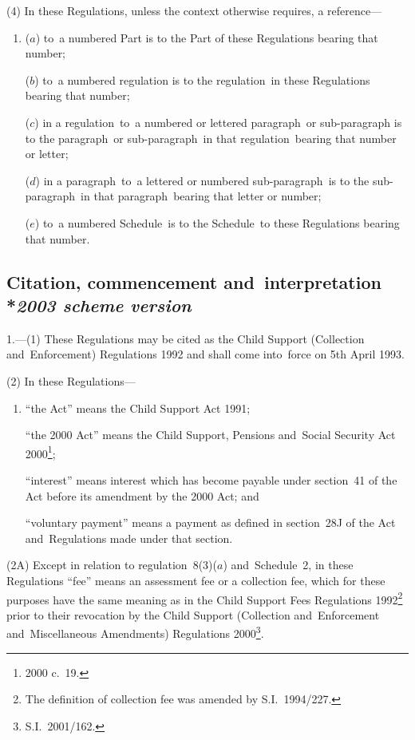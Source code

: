 \documentclass[12pt,a4paper]{article}
\begin{document}
(4) In these Regulations, unless the context otherwise requires, a reference—
\begin{enumerate}\item[]
($a$) to~a numbered Part is to the Part of these Regulations bearing that number;

($b$) to~a numbered regulation is to the regulation~in these Regulations bearing that number;

($c$) in a regulation~to~a numbered or lettered paragraph~or sub-paragraph is to the paragraph~or sub-paragraph~in that regulation~bearing that number or letter;

($d$) in a paragraph~to~a lettered or numbered sub-paragraph~is to the sub-paragraph~in that paragraph~bearing that letter or number;

($e$) to~a numbered Schedule~is to the Schedule~to these Regulations bearing that number.
\end{enumerate}

\subsection[1. Citation, commencement and~interpretation --- \emph{2003 scheme version}]{Citation, commencement and~interpretation\\*\emph{2003 scheme version}}

\renewcommand\parthead{--- Part I}

1.—(1) These Regulations may be cited as the Child Support (Collection and~Enforcement) Regulations 1992 and shall come into~force on 5th April 1993.

(2) In these Regulations—
\begin{enumerate}\item[]
“the Act” means the Child Support Act 1991;

“the 2000 Act” means the Child Support, Pensions and~Social Security Act 2000\footnote{2000 c.~19.};

“interest” means interest which has become payable under section~41 of the Act before its amendment by the 2000 Act; and

“voluntary payment” means a payment as defined in section~28J of the Act and~Regulations made under that section.
\end{enumerate}

(2A) Except in relation to regulation~8(3)($a$)  and~Schedule~2, in these Regulations “fee” means an assessment fee or a collection fee, which for these purposes have the same meaning as in the Child Support Fees Regulations 1992\footnote{The definition of collection fee was amended by S.I.~1994/227.} prior to their revocation by the Child Support (Collection and~Enforcement and~Miscellaneous Amendments) Regulations 2000\footnote{S.I.~2001/162.}.
\end{document}
